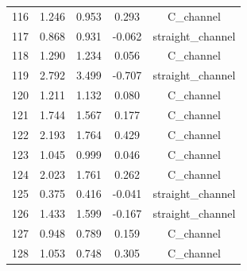 \begin{longtable}{ccccc}
116 & 1.246 & 0.953 & 0.293 & C_channel \\
117 & 0.868 & 0.931 & -0.062 & straight_channel \\
118 & 1.290 & 1.234 & 0.056 & C_channel \\
119 & 2.792 & 3.499 & -0.707 & straight_channel \\
120 & 1.211 & 1.132 & 0.080 & C_channel \\
121 & 1.744 & 1.567 & 0.177 & C_channel \\
122 & 2.193 & 1.764 & 0.429 & C_channel \\
123 & 1.045 & 0.999 & 0.046 & C_channel \\
124 & 2.023 & 1.761 & 0.262 & C_channel \\
125 & 0.375 & 0.416 & -0.041 & straight_channel \\
126 & 1.433 & 1.599 & -0.167 & straight_channel \\
127 & 0.948 & 0.789 & 0.159 & C_channel \\
128 & 1.053 & 0.748 & 0.305 & C_channel \\
\bottomrule
\end{longtable}